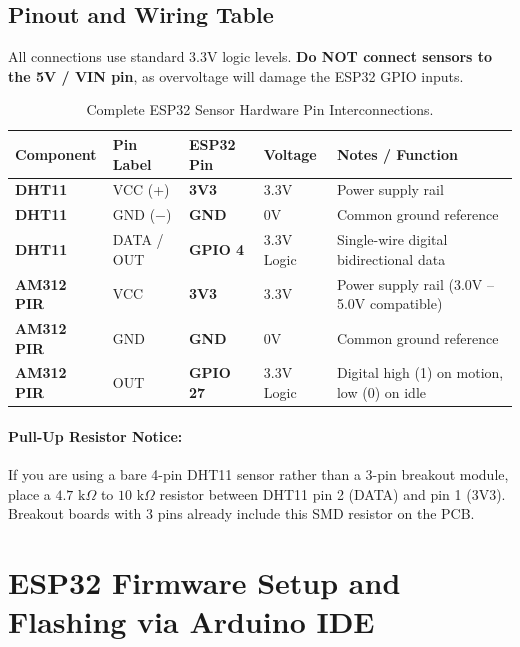 \documentclass[11pt,a4paper]{article}
\begin{document}
\subsection{Pinout and Wiring Table}
All connections use standard 3.3V logic levels. \textbf{Do NOT connect sensors to the 5V / VIN pin}, as overvoltage will damage the ESP32 GPIO inputs.

\begin{table}[htbp]
\centering
\begin{tabularx}{\textwidth}{llllX}
\toprule
\textbf{Component} & \textbf{Pin Label} & \textbf{ESP32 Pin} & \textbf{Voltage} & \textbf{Notes / Function} \\
\midrule
\textbf{DHT11} & VCC (+) & \textbf{3V3} & 3.3V & Power supply rail \\
\textbf{DHT11} & GND ($-$) & \textbf{GND} & 0V & Common ground reference \\
\textbf{DHT11} & DATA / OUT & \textbf{GPIO 4} & 3.3V Logic & Single-wire digital bidirectional data \\
\midrule
\textbf{AM312 PIR} & VCC & \textbf{3V3} & 3.3V & Power supply rail (3.0V -- 5.0V compatible) \\
\textbf{AM312 PIR} & GND & \textbf{GND} & 0V & Common ground reference \\
\textbf{AM312 PIR} & OUT & \textbf{GPIO 27} & 3.3V Logic & Digital high (1) on motion, low (0) on idle \\
\bottomrule
\end{tabularx}
\caption{Complete ESP32 Sensor Hardware Pin Interconnections.}
\end{table}

\paragraph{Pull-Up Resistor Notice:} If you are using a bare 4-pin DHT11 sensor rather than a 3-pin breakout module, place a $4.7\text{ k}\Omega$ to $10\text{ k}\Omega$ resistor between DHT11 pin 2 (DATA) and pin 1 (3V3). Breakout boards with 3 pins already include this SMD resistor on the PCB.

\section{ESP32 Firmware Setup and Flashing via Arduino IDE}
\end{document}
